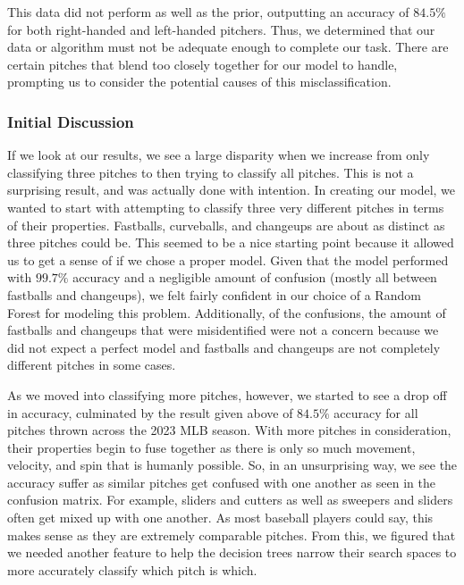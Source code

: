 \documentclass{article}
\begin{document}
This data did not perform as well as the prior, outputting an accuracy of $84.5\%$
for both right-handed and left-handed pitchers. Thus, we determined that our data or algorithm must not
be adequate enough to complete our task. There are certain pitches that blend too closely
together for our model to handle, prompting us to consider the potential causes of this misclassification.

\subsubsection{Initial Discussion}

If we look at our results, we see a large disparity when we increase from only classifying 
three pitches to then trying to classify all pitches. This is not a surprising result, and 
was actually done with intention. In creating our model, we wanted to start with attempting 
to classify three very different pitches in terms of their properties. Fastballs, curveballs, 
and changeups are about as distinct as three pitches could be. This seemed to be a nice 
starting point because it allowed us to get a sense of if we chose a proper model. Given that the model 
performed with $99.7\%$ accuracy and a negligible amount of confusion (mostly all between fastballs 
and changeups), we felt fairly confident in our choice of a Random Forest for modeling this problem. 
Additionally, of the confusions, the amount of fastballs and changeups that were misidentified were 
not a concern because we did not expect a perfect model and fastballs and changeups are not completely 
different pitches in some cases.

As we moved into classifying more pitches, however, we started to see a drop off in accuracy, culminated 
by the result given above of $84.5\%$ accuracy for all pitches thrown across the 2023 MLB season. 
With more pitches in consideration, their properties begin to fuse together as there is only so 
much movement, velocity, and spin that is humanly possible. So, in an unsurprising way, we see the 
accuracy suffer as similar pitches get confused with one another as seen in the confusion matrix. 
For example, sliders and cutters as well as sweepers and sliders often get mixed up with one another. 
As most baseball players could say, this makes sense as they are extremely comparable pitches. From 
this, we figured that we needed another feature to help the decision trees narrow their search spaces 
to more accurately classify which pitch is which.
\end{document}
